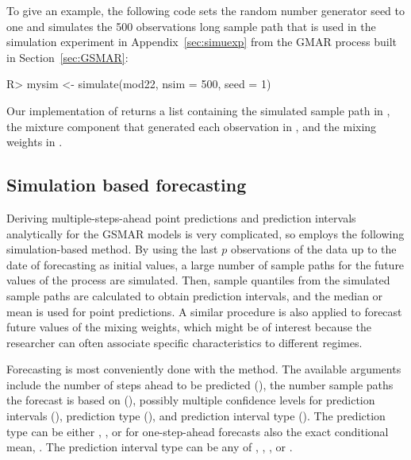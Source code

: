 \documentclass[nojss]{jss} %
\begin{document}
To give an example, the following code sets the random number generator seed to one and simulates the 500 observations long sample path that is used in the simulation experiment in Appendix~\ref{sec:simuexp} from the GMAR process built in Section~\ref{sec:GSMAR}:
%
\begin{CodeChunk}
\begin{CodeInput}
R> mysim <- simulate(mod22, nsim = 500, seed = 1)
\end{CodeInput}
\end{CodeChunk}
%
Our implementation of  returns a list containing the simulated sample path in , the mixture component that generated each observation in , and the mixing weights in .

\subsection{Simulation based forecasting}
Deriving multiple-steps-ahead point predictions and prediction intervals analytically for the GSMAR models is very complicated, so  employs the following simulation-based method. By using the last $p$ observations of the data up to the date of forecasting as initial values, a large number of sample paths for the future values of the process are simulated. Then, sample quantiles from the simulated sample paths are calculated to obtain prediction intervals, and the median or mean is used for point predictions. A similar procedure is also applied to forecast future values of the mixing weights, which might be of interest because the researcher can often associate specific characteristics to different regimes.

Forecasting is most conveniently done with the  method. The available arguments include the number of steps ahead to be predicted (), the number sample paths the forecast is based on (), possibly multiple confidence levels for prediction intervals (), prediction type (), and prediction interval type (). The prediction type can be either , , or for one-step-ahead forecasts also the exact conditional mean, . The prediction interval type can be any of , , , or .
\end{document}
